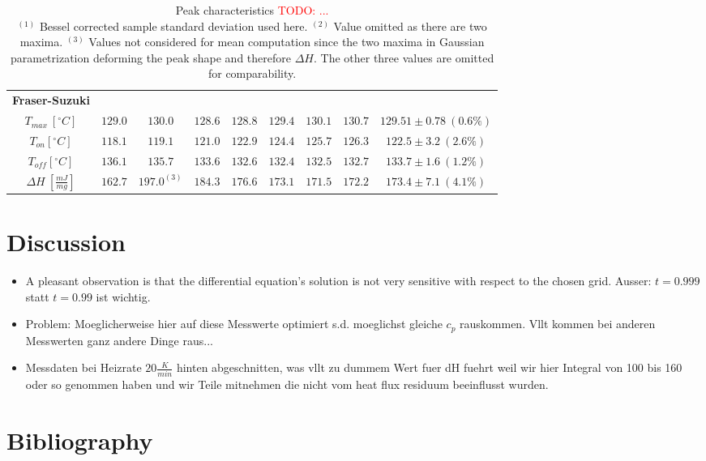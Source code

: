 \documentclass{scrartcl}[12pt, halfparskip]
\numberwithin{equation}{section}
\numberwithin{figure}{section}
\numberwithin{table}{section}
\newcommand{\todo}[1]{\textcolor{red}{TODO: #1}}
\begin{document}
\begin{table}[H]
\begin{tabular}{| c | c | c | c | c | c | c | c || c |}
		
		\textbf{Fraser-Suzuki} & & & & & & & & \\[0.7ex]
		$T_{max} \ [^{\circ}C]$ & $129.0$ & $130.0$ & $128.6$ & $128.8$ & $129.4$ & $130.1$ & $130.7$ & $129.51 \pm 0.78 \ (0.6\%)$ \\[0.7ex]
		$T_{on} [^{\circ} C]$ & $118.1$ & $119.1$ & $121.0$ & $122.9$ & $124.4$ & $125.7$ & $126.3$ & $122.5 \pm 3.2 \ (2.6\%)$ \\[0.7ex]
		$T_{off} [^{\circ} C]$ & $136.1$ & $135.7$ & $133.6$ & $132.6$ & $132.4$ & $132.5$ & $132.7$ & $133.7 \pm 1.6 \ (1.2\%)$ \\[0.7ex]
		$\Delta H \ [\frac{mJ}{mg}]$ & $162.7$ & $197.0^{(3)}$ & $184.3$ & $176.6$ & $173.1$ & $171.5$ & $172.2$ & $173.4 \pm 7.1 \ (4.1\%)$ \\ \hline
	\end{tabular}
	\caption{Peak characteristics \todo{...} \\
	$^{(1)}$ Bessel corrected sample standard deviation used here. $^{(2)}$ Value omitted as there are two maxima. $^{(3)}$ Values not considered for mean computation since the two maxima in Gaussian parametrization deforming the peak shape and therefore $\Delta H$. The other three values are omitted for comparability. }
	\label{tab:eval_table_summary}
\end{table}




\newpage
\section{Discussion}

\begin{itemize}
	\item A pleasant observation is that the differential equation's solution is not very sensitive with respect to the chosen grid.  Ausser: $t=0.999$ statt $t=0.99$ ist wichtig.
	\item Problem: Moeglicherweise hier auf diese Messwerte optimiert s.d. moeglichst gleiche $c_p$ rauskommen. Vllt kommen bei anderen Messwerten ganz andere Dinge raus...
	\item Messdaten bei Heizrate $20 \frac{K}{min}$ hinten abgeschnitten, was vllt zu dummem Wert fuer dH fuehrt weil wir hier Integral von 100 bis 160 oder so genommen haben und wir Teile mitnehmen die nicht vom heat flux residuum beeinflusst wurden.
\end{itemize}


\newpage
\section{Bibliography}
\end{document}
